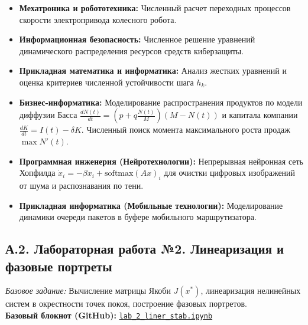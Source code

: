 \documentclass[12pt]{article}
\begin{document}
\begin{itemize}[nosep]
    \item \textbf{Мехатроника и робототехника:} Численный расчет переходных процессов скорости электропривода колесного робота.
    \item \textbf{Информационная безопасность:} Численное решение уравнений динамического распределения ресурсов средств киберзащиты.
    \item \textbf{Прикладная математика и информатика:} Анализ жестких уравнений и оценка критериев численной устойчивости шага $h_k$.
    \item \textbf{Бизнес-информатика:} Моделирование распространения продуктов по модели диффузии Басса $\frac{dN(t)}{dt} = \left(p + q \frac{N(t)}{M}\right)(M - N(t))$ и капитала компании $\frac{dK}{dt} = I(t) - \delta K$. Численный поиск момента максимального роста продаж $\max N'(t)$.
    \item \textbf{Программная инженерия (Нейротехнологии):} Непрерывная нейронная сеть Хопфилда $\dot{x}_i = -\beta x_i + \text{softmax}(Ax)_i$ для очистки цифровых изображений от шума и распознавания по тени.
    \item \textbf{Прикладная информатика (Мобильные технологии):} Моделирование динамики очереди пакетов в буфере мобильного маршрутизатора.
\end{itemize}

\subsection*{А.2. Лабораторная работа №2. Линеаризация и фазовые портреты}\label{app:A2}
\textit{Базовое задание:} Вычисление матрицы Якоби $J(x^*)$, линеаризация нелинейных систем в окрестности точек покоя, построение фазовых портретов.\\[0.2em]
\textbf{Базовый блокнот (GitHub):} \href{https://github.com/SikioN/dif-eq/blob/main/lab/lab_2_liner_stab.ipynb}{\texttt{lab\_2\_liner\_stab.ipynb}}
\end{document}
